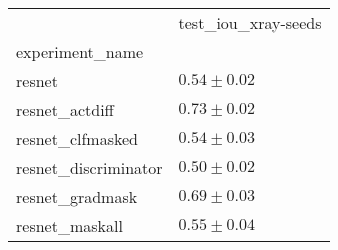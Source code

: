 \begin{tabular}{ll}
\toprule
{} & test_iou_xray-seeds \\
experiment_name      &                     \\
\midrule
resnet               &       $0.54\pm0.02$ \\
resnet_actdiff       &       $0.73\pm0.02$ \\
resnet_clfmasked     &       $0.54\pm0.03$ \\
resnet_discriminator &       $0.50\pm0.02$ \\
resnet_gradmask      &       $0.69\pm0.03$ \\
resnet_maskall       &       $0.55\pm0.04$ \\
\bottomrule
\end{tabular}
